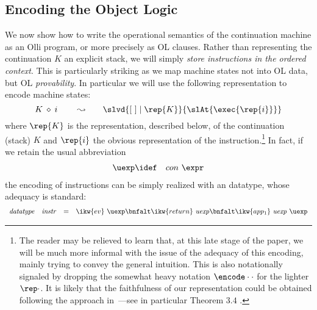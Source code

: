 \documentclass[final]{svjour3}
\begin{document}
\subsection{Encoding the Object Logic}
\label{ssec:oprog}


We now show how to write the operational semantics of the continuation
machine as an Olli program, or more precisely as \ollim OL clauses.  
Rather than representing the continuation $K$ an explicit stack, we
will simply \emph{store instructions in the ordered context}. This is
particularly striking as we map machine states not into OL
data, but OL \emph{provability}.  In particular we will use the
following representation to encode machine states:
\[
K\:\diamond\:i \qquad \mbox{ $\leadsto$} \qquad 
\slvd{\elist\coln\rep{K}}{\slAt{\exec {\rep{i}}}}
\]
where $\rep{K}$ is the representation, described below, of the
continuation (stack) $K$ and $\rep{i}$ the obvious representation of
the instruction.\footnote{The reader may be relieved to learn that, at this
  late stage of the paper, we will be much more informal with the
  issue of the adequacy of this encoding, mainly trying to convey the
  general intuition. This is also notationally signaled by dropping
  the somewhat heavy notation $\encode \cdot \cdot$ for the lighter
  $\rep \cdot$. It is likely that the faithfulness of our
  representation could be obtained following the approach
  in~\cite{CervesatoP02}---see in particular Theorem $3.4$ \ibid.}  In fact,
if we retain the usual abbreviation
\begin{eqnarray*}
    \uexp &\idef &con\ \expr
\end{eqnarray*}
 the encoding of instructions can be simply realized with an \HOL
datatype, whose adequacy is standard: \[ \begin{array}{rrcl} \mbox{\textit{datatype}}& \mathit{instr} & = &
  \ikw{ev} \ \uexp\bnfalt\ikw{return} \ \mathit{uexp}\bnfalt
  \ikw{app_1} \ \mathit{uexp}\ \uexp
\end{array} \] 

\renewcommand{\Val}{\uexp} 
\end{document}
